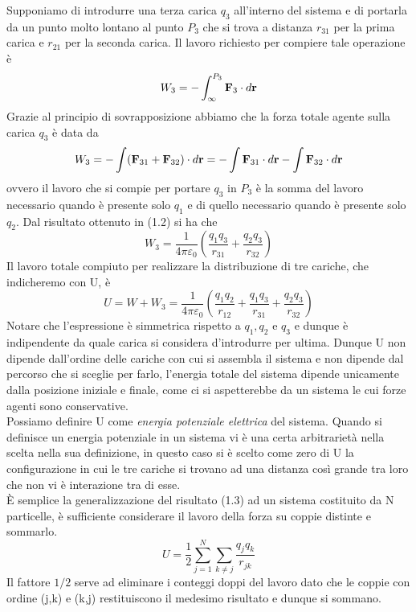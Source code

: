  \noindent Supponiamo di introdurre una terza carica $q_3$ all'interno del sistema e di portarla da un punto molto lontano al punto $P_3$ che si trova  a distanza $r_{31}$ per la prima carica e $r_{21}$ per la seconda carica. Il lavoro richiesto per compiere tale operazione \`e 
 \begin{equation*}
 	W_3 = - \int_{\infty}^{P_3}\bold{F}_3 \cdot d\bold{r}
 \end{equation*} 
 Grazie al principio di sovrapposizione abbiamo che la forza totale agente sulla carica $q_3$ \`e data da 
 \begin{equation*}
 	W_3 = - \int (\bold{F}_{31}+\bold{F}_{32}) \cdot d\bold{r} = - \int \bold{F}_{31} \cdot d\bold{r} - \int \bold{F}_{32} \cdot d \bold{r}
 \end{equation*}
 ovvero il lavoro che si compie per portare $q_3$ in $P_3$ \`e la somma del lavoro necessario quando \`e presente solo $q_1$ e di quello necessario quando \`e presente solo $q_2$. Dal risultato ottenuto in (1.2) si ha che
 \begin{equation*}
 	W_3 = \frac{1}{4 \pi \varepsilon_0} \left (\frac{q_1q_3}{r_{31}} + \frac{q_2q_3}{r_{32}} \right )
 \end{equation*}
 Il lavoro totale compiuto per realizzare la distribuzione di tre cariche, che indicheremo con U, \`e 
 \begin{equation}
 	U = W +W_3 = \frac{1}{4 \pi \varepsilon_0} \left (\frac{q_1q_2}{r_{12}} + \frac{q_1q_3}{r_{31}} + \frac{q_2q_3}{r_{32}} \right)
 \end{equation}
 Notare che l'espressione \`e simmetrica rispetto a $q_1,q_2$ e $q_3$ e dunque \`e indipendente da quale carica si considera d'introdurre per ultima. Dunque U non dipende dall'ordine delle cariche con cui si assembla il sistema e non dipende dal percorso che si sceglie per farlo, l'energia totale del sistema dipende unicamente dalla posizione iniziale e finale, come ci si aspetterebbe da un sistema le cui forze agenti sono conservative.
 \\
 Possiamo definire U come \textit{energia potenziale elettrica} del sistema. Quando si definisce un energia potenziale in un sistema vi \`e una certa arbitrariet\`a nella scelta nella sua definizione, in questo caso si \`e scelto come zero di U la configurazione in cui le tre cariche si trovano ad una distanza cos\`i grande tra loro che non vi \`e interazione tra di esse.
 \\
 
 \noindent \`E semplice la generalizzazione del risultato (1.3) ad un sistema costituito da N particelle, \`e sufficiente considerare il lavoro della forza su coppie distinte e sommarlo.
 \begin{equation}
 	U = \frac{1}{2} \sum_{j=1}^N \sum_{k \neq j} \frac{q_jq_k}{r_{jk}}
 \end{equation}
 Il fattore $1/2$ serve ad eliminare i conteggi doppi del lavoro dato che le coppie con ordine (j,k) e (k,j) restituiscono il medesimo risultato e dunque si sommano.


